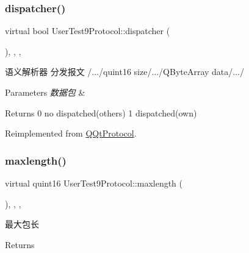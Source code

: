 \subsubsection{\texorpdfstring{dispatcher()}{dispatcher()}}
{\footnotesize\ttfamily virtual bool User\+Test9\+Protocol\+::dispatcher (\begin{DoxyParamCaption}\item[{const Q\+Byte\+Array \&}]{ }\end{DoxyParamCaption})\hspace{0.3cm}{\ttfamily [inline]}, {\ttfamily [override]}, {\ttfamily [protected]}, {\ttfamily [virtual]}}



语义解析器 分发报文 /.../quint16 size/.../\+Q\+Byte\+Array data/.../ 


\begin{DoxyParams}{Parameters}
{\em 数据包} & \\
\hline
\end{DoxyParams}
\begin{DoxyReturn}{Returns}
0 no dispatched(others) 1 dispatched(own) 
\end{DoxyReturn}


Reimplemented from \mbox{\hyperlink{class_q_qt_protocol_a35a69c4b89c8cf7459038f40d75e0dc9}{Q\+Qt\+Protocol}}.

\mbox{\label{class_user_test9_protocol_a77d2d555e492aaf2e8cc98b2b16dedd7}} 
\subsubsection{\texorpdfstring{maxlength()}{maxlength()}}
{\footnotesize\ttfamily virtual quint16 User\+Test9\+Protocol\+::maxlength (\begin{DoxyParamCaption}{ }\end{DoxyParamCaption})\hspace{0.3cm}{\ttfamily [inline]}, {\ttfamily [override]}, {\ttfamily [protected]}, {\ttfamily [virtual]}}



最大包长 

\begin{DoxyReturn}{Returns}

\end{DoxyReturn}


